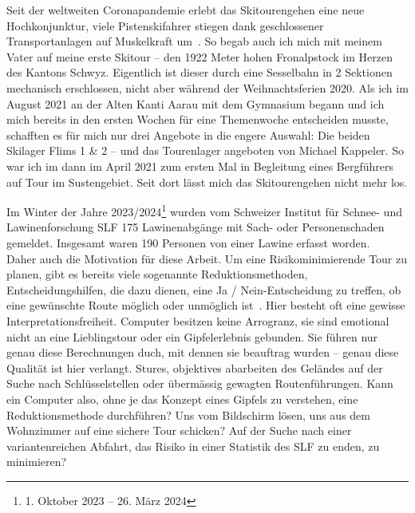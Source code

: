 \begin{multicols}{2}



Seit der weltweiten Coronapandemie erlebt das Skitourengehen eine neue Hochkonjunktur, viele Pistenskifahrer stiegen dank geschlossener Transportanlagen auf Muskelkraft um~\cite{sacCoronaTrend}. So begab auch ich mich mit meinem Vater auf meine erste Skitour – den 1922 Meter hohen Fronalpstock im Herzen des Kantons Schwyz. Eigentlich ist dieser durch eine Sesselbahn in 2 Sektionen mechanisch erschlossen, nicht aber während der Weihnachtsferien 2020.
Als ich im August 2021 an der Alten Kanti Aarau mit dem Gymnasium begann und ich mich bereits in den ersten Wochen für eine Themenwoche entscheiden musste, schafften es für mich nur drei Angebote in die engere Auswahl: Die beiden Skilager Flims 1 \& 2 – und das Tourenlager angeboten von Michael Kappeler. So war ich im dann im April 2021 zum ersten Mal in Begleitung eines Bergführers auf Tour im Sustengebiet. Seit dort lässt mich das Skitourengehen nicht mehr los.

Im Winter der Jahre 2023/2024\footnote{1. Oktober 2023 -- 26. März 2024} wurden vom Schweizer Institut für Schnee- und Lawinenforschung SLF 175 Lawinenabgänge mit Sach- oder Personenschaden gemeldet. Insgesamt waren 190 Personen von einer Lawine erfasst worden.~\cite{slfWinterbericht202324}
\vfill\null
\columnbreak
Daher auch die Motivation für diese Arbeit. Um eine Risikominimierende Tour zu planen, gibt es bereits viele sogenannte Reduktionsmethoden, Entscheidungshilfen, die dazu dienen, eine Ja / Nein-Entscheidung zu treffen, ob eine gewünschte Route möglich oder unmöglich ist~\cite{skitourenguruReduktionsmethoden}.
Hier besteht oft eine gewisse Interpretationsfreiheit. Computer besitzen keine Arrogranz, sie sind emotional nicht an eine Lieblingstour oder ein Gipfelerlebnis gebunden. Sie führen nur genau diese Berechnungen duch, mit dennen sie beauftrag wurden – genau diese Qualität ist hier verlangt. Stures, objektives abarbeiten des Geländes auf der Suche nach Schlüsselstellen oder übermässig gewagten Routenführungen. Kann ein Computer also, ohne je das Konzept eines Gipfels zu verstehen, eine Reduktionsmethode durchführen? Uns vom Bildschirm lösen, uns aus dem Wohnzimmer auf eine sichere Tour schicken? 
Auf der Suche nach einer variantenreichen Abfahrt, das Risiko in einer Statistik des SLF zu enden, zu minimieren?


\end{multicols}
